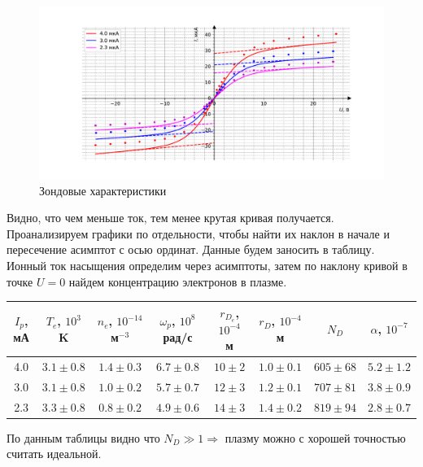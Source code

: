 \documentclass[a4paper, 10pt]{article}
\begin{document}
        \begin{figure}[h!]
        	\centering
        	\includegraphics[width = \textwidth]{zond.pdf}
          \caption{Зондовые характеристики}
        \end{figure}

        Видно, что чем меньше ток, тем менее крутая кривая получается. Проанализируем графики по отдельности, чтобы найти их наклон в начале и пересечение асимптот с осью ординат. Данные будем заносить в таблицу. Ионный ток насыщения определим через асимптоты, затем по наклону кривой в точке $U = 0$ найдем концентрацию электронов в плазме.

      \begin{table}[h!]
      \begin{tabular}{|c|c|c|c|c|c|c|c|}
      \hline
      $I_p$, мА & $T_e$, $10^3$ K & $n_e$, $10^{-14}$ м$^{-3}$ & $\omega_p$, $10^8$ рад/с & $r_{D_e}$, $10^{-4}$ м & $r_D$, $10^{-4}$ м & $N_D$ & $\alpha$, $10^{-7}$ \\ \hline
      4.0 & $ 3.1 \pm  0.8$ & $1.4 \pm 0.3$ & $6.7 \pm 0.8$ & $10 \pm 2$ & $1.0 \pm 0.1$ & $605 \pm 68$ & $5.2 \pm 1.2$ \\ \hline
      3.0 & $ 3.1 \pm  0.8$ & $1.0 \pm 0.2$ & $5.7 \pm 0.7$ & $12 \pm 3$ & $1.2 \pm 0.1$ & $707 \pm 81$ & $3.8 \pm 0.9$ \\ \hline
      2.3 & $ 3.3 \pm  0.8$ & $0.8 \pm 0.2$ & $4.9 \pm 0.6$ & $14 \pm 3$ & $1.4 \pm 0.2$ & $819 \pm 94$ & $2.8 \pm 0.7$ \\ \hline
      \end{tabular}
      \end{table}


      По данным таблицы видно что $N_D \gg 1 \Rightarrow$ плазму можно с хорошей точностью считать идеальной.
\end{document}
